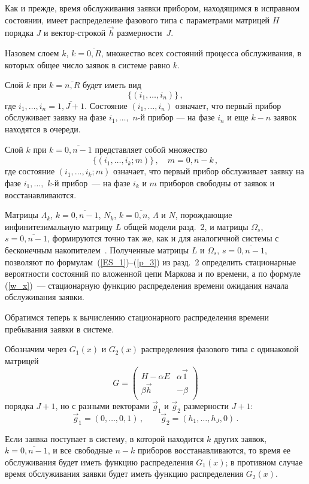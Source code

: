 \begin{multicols}{2}
Как и прежде, время обслуживания заявки прибором, находящимся в исправном
состоянии, имеет распределение фазового типа с параметрами мат\-ри\-цей $H$
порядка $J$ и вектор-строкой $\vec h$ размерности~$J$.

Назовем слоем $k$, $k=\overline{0,R}$, множество
всех состояний процесса обслуживания, в которых общее число заявок
в системе равно $k$.

Слой $k$ при $k=\overline{n,R}$ будет иметь вид
$$
\{(i_1,\ldots,i_n)\}\,,
$$
где
$i_1,\ldots,i_n=\overline{1,J+1}$.
Состояние $(i_1,\ldots,i_n)$ означает, что первый прибор
обслуживает заявку на фазе $i_1,\ldots,$ $n$-й прибор --- на фазе $i_n$ и
еще $k-n$ заявок находятся в очереди.


Слой $k$ при $k=\overline{0,n-1}$ представляет собой множество
$$
\{(i_1,\ldots,i_k;m)\}\,,
\quad m=\overline{0,n-k}\,,
$$
где состояние $(i_1,\ldots,i_k;m)$ означает, что первый прибор обслуживает
заявку на фазе $i_1,\ldots,$ $k$-й прибор~--- на фазе $i_k$ и
$m$ приборов свободны от заявок и восстанавливаются.

Матрицы $\Lambda_k$, $k=\overline{0,n-1}$, $N_k$,
$k=\overline{0,n}$,
$\Lambda$ и $N$, порождающие инфинитезимальную матрицу $L$ общей
модели разд.~2, и матрицы $\Omega_s$, $s=\overline{0,n-1}$,
формируются точно так же, как и для аналогичной системы с бесконечным
накопителем~\cite{PSCh06}.
Полученные матрицы $L$ и $\Omega_s$, $s=\overline{0,n-1}$, позволяют
по формулам~(\ref{ES_1})--(\ref{p_3}) из разд.~2 определить стационарные
вероятности состояний по вложенной цепи Маркова и по времени,
а по формуле (\ref{w_x})~--- стационарную функцию распределения времени
ожидания начала обслуживания заявки.

Обратимся теперь к вычислению стационарного распределения времени
пребывания заявки в системе.

Обозначим через $G_1(x)$ и $G_2(x)$ распределения фазового типа с
одинаковой матрицей
$$
G=
\begin{pmatrix}
H-\alpha E       &  \alpha \vec1  \\
\beta \vec h     &  - \beta       \\
\end{pmatrix}
$$
порядка $J+1$, но с разными векторами ${\vec g}_1$ и ${\vec g}_2$
размерности $J+1$:
$$
{\vec g}_1=(0,\ldots,0,1)\,,\qquad
{\vec g}_2 = (h_1,\ldots,h_J,0)\,.
$$

Если заявка поступает в систему, в которой находится
$k$  других заявок, $k=\overline{0,n-1}$,
и все свободные $n-k$ приборов восстанавливаются,
то время ее обслуживания будет иметь функцию распределения
$G_1(x)$; в противном случае время обслуживания заявки будет иметь
функцию распределения $G_2(x)$.


\end{multicols}
